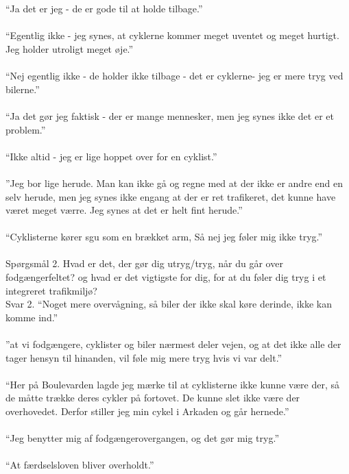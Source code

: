 \\\\
  “Ja det er jeg - de er gode til at holde tilbage.”
\\\\
  “Egentlig ikke - jeg synes, at cyklerne kommer meget uventet og meget hurtigt. Jeg holder utroligt meget øje.”
\\\\
  “Nej egentlig ikke - de holder ikke tilbage - det er cyklerne- jeg er mere tryg ved bilerne.”
\\\\
  “Ja det gør jeg faktisk - der er mange mennesker, men jeg synes ikke det er et problem.”
\\\\
  “Ikke altid - jeg er lige hoppet over for en cyklist.”
\\\\
  ”Jeg bor lige herude. Man kan ikke gå og regne med at der ikke er andre end en selv herude, men jeg synes ikke engang at der er ret trafikeret, det kunne have været meget værre. Jeg synes at det er helt fint herude.”
\\\\
  “Cyklisterne kører sgu som en brækket arm, Så nej jeg føler mig ikke tryg.”
\\\\
  Spørgsmål 2.
  Hvad er det, der gør dig utryg/tryg, når du går over fodgængerfeltet? og hvad er det vigtigste for dig, for at du føler dig tryg i et integreret trafikmiljø?
  \\
   Svar 2.
  “Noget mere overvågning, så biler der ikke skal køre derinde, ikke kan komme ind.”
\\\\
  ”at vi fodgængere, cyklister og biler nærmest deler vejen, og at det ikke alle der tager hensyn til hinanden, vil føle mig mere tryg hvis vi var delt.”
\\\\
  “Her på Boulevarden lagde jeg mærke til at cyklisterne ikke kunne være der, så de måtte trække deres cykler på fortovet. De kunne slet ikke være der overhovedet.  Derfor stiller jeg min cykel i Arkaden og går hernede.”
\\\\
  “Jeg benytter mig af fodgængerovergangen, og det gør mig tryg.”
\\\\
  “At færdselsloven bliver overholdt.”
\\\\
